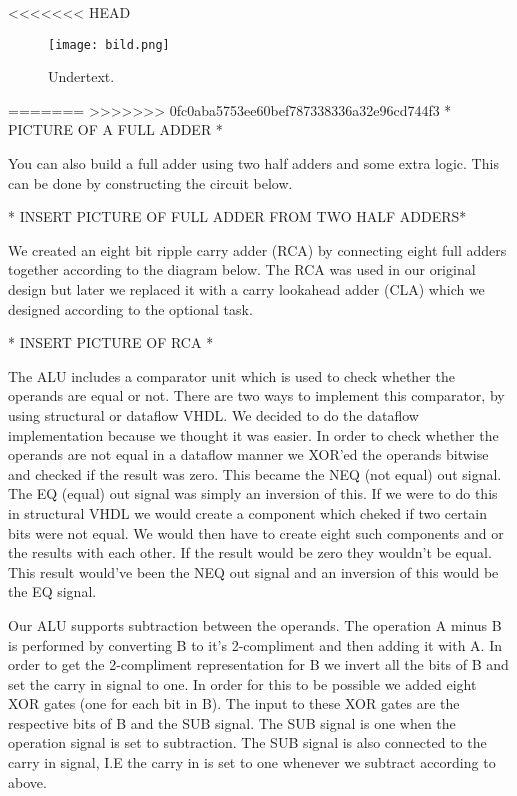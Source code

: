 \documentclass[a4paper,11pt]{article}
\begin{document}
<<<<<<< HEAD
\begin{figure}[h!]
  \texttt{[image: bild.png]}
  \caption{Undertext.}
  \label{fig:etikett}
\end{figure}

=======
>>>>>>> 0fc0aba5753ee60bef787338336a32e96cd744f3
* PICTURE OF A FULL ADDER *

You can also build a full adder using two half adders and some extra logic. This can be done by constructing the circuit below.

* INSERT PICTURE OF FULL ADDER FROM TWO HALF ADDERS*

We created an eight bit ripple carry adder (RCA) by connecting eight full adders together according to the diagram below. The RCA was used in our original design but later we replaced it with a carry lookahead adder (CLA) which we designed according to the optional task. 

* INSERT PICTURE OF RCA *

The ALU includes a comparator unit which is used to check whether the operands are equal or not. There are two ways to implement this comparator, by using structural or dataflow VHDL. We decided to do the dataflow implementation because we thought it was easier. In order to check whether the operands are not equal in a dataflow manner we XOR'ed the operands bitwise and checked if the result was zero. This became the NEQ (not equal) out signal. The EQ (equal) out signal was simply an inversion of this. If we were to do this in structural VHDL we would create a component which cheked if two certain bits were not equal. We would then have to create eight such components and or the results with each other. If the result would be zero they wouldn't be equal. This result would've been the NEQ out signal and an inversion of this would be the EQ signal. 

Our ALU supports subtraction between the operands. The operation A minus B is performed by converting B to it's 2-compliment and then adding it with A. In order to get the 2-compliment representation for B we invert all the bits of B and set the carry in signal to one. In order for this to be possible we added eight XOR gates (one for each bit in B). The input to these XOR gates are the respective bits of B and the SUB signal. The SUB signal is one when the operation signal is set to subtraction. The SUB signal is also connected to the carry in signal, I.E the carry in is set to one whenever we subtract according to above.
\end{document}
